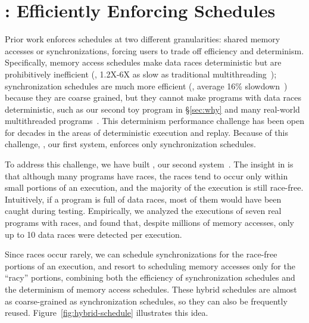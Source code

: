\section{\peregrine: Efficiently Enforcing Schedules} \label{sec:peregrine}


Prior work enforces schedules at two different granularities: shared
memory accesses or synchronizations, forcing users to trade off efficiency
and determinism.  Specifically, memory access schedules make data races
deterministic but are prohibitively inefficient (\eg, 1.2X-6X as slow as
traditional multithreading~\cite{coredet:asplos10}); synchronization
schedules are much more efficient (\eg, average 16\%
slowdown~\cite{kendo:asplos09}) because they are coarse grained, but they
cannot make programs with data races deterministic, such as our second toy
program in \S\ref{sec:why} and many real-world multithreaded
programs~\cite{lu:concurrency-bugs,syncfinder:osdi10}.  This determinism
\vs performance challenge has been open for decades in the areas of
deterministic execution and replay.  Because of this challenge, 
\tern, our first \smt system, enforces only synchronization schedules.

To address this challenge, we have built \peregrine, our second \smt
system~\cite{peregrine:sosp11}.  The insight in \peregrine is that although
many programs have races, the races tend to occur only within small
portions of an execution, and the majority of the execution is still
race-free.  Intuitively, if a program is full of data races, most of them
would have been caught during testing.  Empirically, we analyzed the
executions of seven real programs with races, and found that, despite
millions of memory accesses, only up to 10 data races were detected per
execution.

Since races occur rarely, we can schedule synchronizations for the
race-free portions of an execution, and resort to scheduling memory
accesses only for the ``racy'' portions, combining both the efficiency of
synchronization schedules and the determinism of memory access schedules.
These hybrid schedules are almost as coarse-grained as synchronization
schedules, so they can also be frequently reused.  
Figure~\ref{fig:hybrid-schedule} illustrates this idea.

